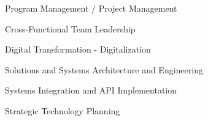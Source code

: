 
\begin{cventries}

  \vspace{5mm}
  \begin{cvitems}
    \setlength\itemsep{0.5em}
      \item {Program Management / Project Management}
      \item {Cross-Functional Team Leadership}
      \item {Digital Transformation - Digitalization}
      \item {Solutions and Systems Architecture and Engineering}
      \item {Systems Integration and API Implementation}
      \item {Strategic Technology Planning}
  \end{cvitems}
  \vspace{5mm}

\end{cventries}

